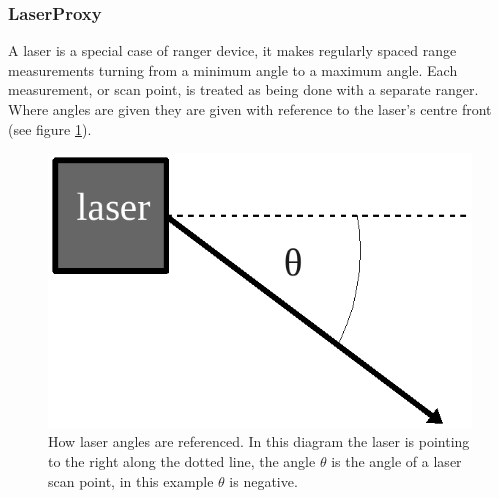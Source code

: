 \documentclass[a4paper]{article}
\begin{document}
\subsubsection{LaserProxy}
A laser is a special case of ranger device, it makes regularly spaced range measurements turning from a minimum angle to a maximum angle. Each measurement, or scan point, is treated as being done with a separate ranger. Where angles are given they are given with reference to the laser's centre front (see figure \ref{fig:laserangles}).


\begin{figure}
	\centering
	\includegraphics[width=0.8\linewidth]{./pics/coding/laserscanner2.png}
	\caption{How laser angles are referenced. In this diagram the laser is pointing to the right along the dotted line, the angle $\theta$ is the angle of a laser scan point, in this example $\theta$ is negative.}
	\label{fig:laserangles}
\end{figure} 
\end{document}
